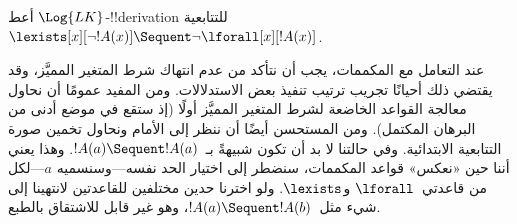 \documentclass[../../../include/open-logic-section]{subfiles}
\begin{document}


\begin{ex}
أعط $\Log{LK}$-!!{derivation} للتتابعية
$\lexists[x][\lnot !A(x)] \Sequent \lnot \lforall[x][!A(x)]$.

عند التعامل مع المكممات، يجب أن نتأكد من عدم انتهاك شرط المتغير
المميَّز، وقد يقتضي ذلك أحيانًا تجريب ترتيب تنفيذ بعض الاستدلالات.
ومن المفيد عمومًا أن نحاول معالجة القواعد الخاضعة لشرط المتغير
المميَّز أولًا (إذ ستقع في موضع أدنى من البرهان المكتمل). ومن المستحسن
أيضًا أن ننظر إلى الأمام ونحاول تخمين صورة التتابعية الابتدائية. وفي
حالتنا لا بد أن تكون شبيهةً بـ~$!A(a) \Sequent !A(a)$. وهذا يعني أننا
حين «نعكس» قواعد المكممات، سنضطر إلى اختيار الحد نفسه---وسنسميه
$a$---لكل من قاعدتي~$\lforall$ و$\lexists$. ولو اخترنا حدين مختلفين
للقاعدتين لانتهينا إلى شيء مثل~$!A(a) \Sequent !A(b)$، وهو غير قابل
للاشتقاق بالطبع.


\end{ex}
\end{document}
